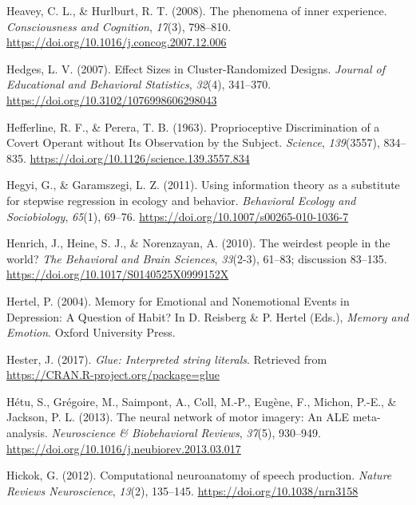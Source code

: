 \documentclass[a4paper,12pt,twoside,onecolumn,openright,final,oldfontcommands]{memoir}
\begin{document}
\leavevmode\hypertarget{ref-heavey_phenomena_2008}{}%
Heavey, C. L., \& Hurlburt, R. T. (2008). The phenomena of inner experience. \emph{Consciousness and Cognition}, \emph{17}(3), 798--810. \url{https://doi.org/10.1016/j.concog.2007.12.006}

\leavevmode\hypertarget{ref-hedges_effect_2007}{}%
Hedges, L. V. (2007). Effect Sizes in Cluster-Randomized Designs. \emph{Journal of Educational and Behavioral Statistics}, \emph{32}(4), 341--370. \url{https://doi.org/10.3102/1076998606298043}

\leavevmode\hypertarget{ref-hefferline_proprioceptive_1963}{}%
Hefferline, R. F., \& Perera, T. B. (1963). Proprioceptive Discrimination of a Covert Operant without Its Observation by the Subject. \emph{Science}, \emph{139}(3557), 834--835. \url{https://doi.org/10.1126/science.139.3557.834}

\leavevmode\hypertarget{ref-hegyi_using_2011}{}%
Hegyi, G., \& Garamszegi, L. Z. (2011). Using information theory as a substitute for stepwise regression in ecology and behavior. \emph{Behavioral Ecology and Sociobiology}, \emph{65}(1), 69--76. \url{https://doi.org/10.1007/s00265-010-1036-7}

\leavevmode\hypertarget{ref-henrich_weirdest_2010}{}%
Henrich, J., Heine, S. J., \& Norenzayan, A. (2010). The weirdest people in the world? \emph{The Behavioral and Brain Sciences}, \emph{33}(2-3), 61--83; discussion 83--135. \url{https://doi.org/10.1017/S0140525X0999152X}

\leavevmode\hypertarget{ref-hertel_memory_2004}{}%
Hertel, P. (2004). Memory for Emotional and Nonemotional Events in Depression: A Question of Habit? In D. Reisberg \& P. Hertel (Eds.), \emph{Memory and Emotion}. Oxford University Press.

\leavevmode\hypertarget{ref-R-glue}{}%
Hester, J. (2017). \emph{Glue: Interpreted string literals}. Retrieved from \url{https://CRAN.R-project.org/package=glue}

\leavevmode\hypertarget{ref-hetu_neural_2013}{}%
Hétu, S., Grégoire, M., Saimpont, A., Coll, M.-P., Eugène, F., Michon, P.-E., \& Jackson, P. L. (2013). The neural network of motor imagery: An ALE meta-analysis. \emph{Neuroscience \& Biobehavioral Reviews}, \emph{37}(5), 930--949. \url{https://doi.org/10.1016/j.neubiorev.2013.03.017}

\leavevmode\hypertarget{ref-hickok_computational_2012}{}%
Hickok, G. (2012). Computational neuroanatomy of speech production. \emph{Nature Reviews Neuroscience}, \emph{13}(2), 135--145. \url{https://doi.org/10.1038/nrn3158}
\end{document}
